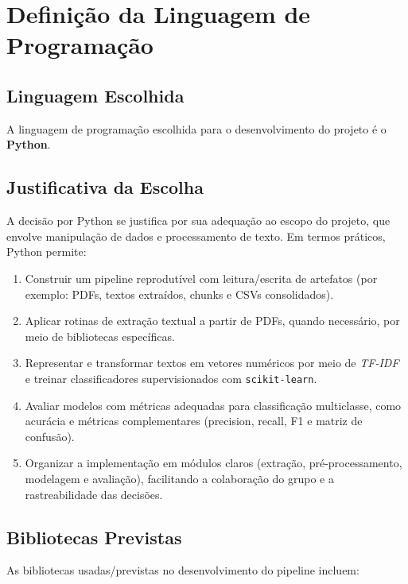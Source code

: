 \clearpage
\section{Definição da Linguagem de Programação}

\subsection{Linguagem Escolhida}

A linguagem de programação escolhida para o desenvolvimento do projeto é o \textbf{Python}.

\subsection{Justificativa da Escolha}

A decisão por Python se justifica por sua adequação ao escopo do projeto, que envolve manipulação de dados e processamento de texto. Em termos práticos, Python permite:

\begin{enumerate}[leftmargin=1.2cm]
    \item Construir um pipeline reprodutível com leitura/escrita de artefatos (por exemplo: PDFs, textos extraídos, chunks e CSVs consolidados).
    \item Aplicar rotinas de extração textual a partir de PDFs, quando necessário, por meio de bibliotecas específicas.
    \item Representar e transformar textos em vetores numéricos por meio de \textit{TF-IDF} e treinar classificadores supervisionados com \texttt{scikit-learn}.
    \item Avaliar modelos com métricas adequadas para classificação multiclasse, como acurácia e métricas complementares (precision, recall, F1 e matriz de confusão).
    \item Organizar a implementação em módulos claros (extração, pré-processamento, modelagem e avaliação), facilitando a colaboração do grupo e a rastreabilidade das decisões.
\end{enumerate}

\subsection{Bibliotecas Previstas}

As bibliotecas usadas/previstas no desenvolvimento do pipeline incluem:

